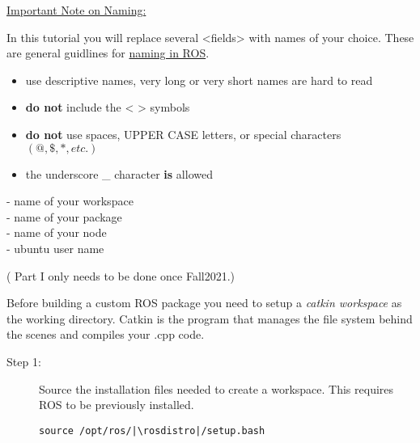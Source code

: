 \documentclass[12pt]{article}
\begin{document}
\begin{description}[labelindent=1cm]
\begin{framed}
	\item[\underline{Important Note on Naming:}] \hfill \vspace{0mm} 
	
In this tutorial you will replace several <fields> with names of your choice. These are general guidlines for \href{http://wiki.ros.org/ROS/Patterns/Conventions}{naming in ROS}. \vspace{3mm} 
\begin{itemize}
\item use descriptive names, very long or very short names are hard to read
\item \textbf{do not} include the < > symbols
\item \textbf{do not} use spaces, UPPER CASE letters, or special characters $(@,\$,*, etc.)$
\item the underscore \_ character \textbf{is} allowed \vspace{0mm}\\
\end{itemize}
    \wspname \hspace{2mm} - name of your workspace \vspace{3mm}\\
    \pkgname \hspace{2mm} - name of your package  \vspace{3mm}\\
    \nodname \hspace{2mm} - name of your node  \vspace{3mm}\\
	\usrname \hspace{2mm} - ubuntu user name \vspace{3mm}\\
	
	\end{framed}
	\newpage
	\item[\textbf{\underline{ Part I - Setup the \href{http://wiki.ros.org/catkin/Tutorials/create_a_workspace}{Workspace:} }}] {\GR ( Part I only needs to be done once Fall2021.) }   \hfill \vspace{0mm}
	
	Before building a custom ROS package you need to setup a {\it catkin workspace} as the working directory. Catkin is the program that manages the file system behind the scenes and compiles your .cpp code. 
	
	\begin{description}
		\item[Step 1:] Source the installation files needed to create a workspace. This requires ROS to be previously installed.
		\begin{verbatim}
source /opt/ros/|\rosdistro|/setup.bash
		\end{verbatim}
		

\end{description}
\end{description}
\end{document}
